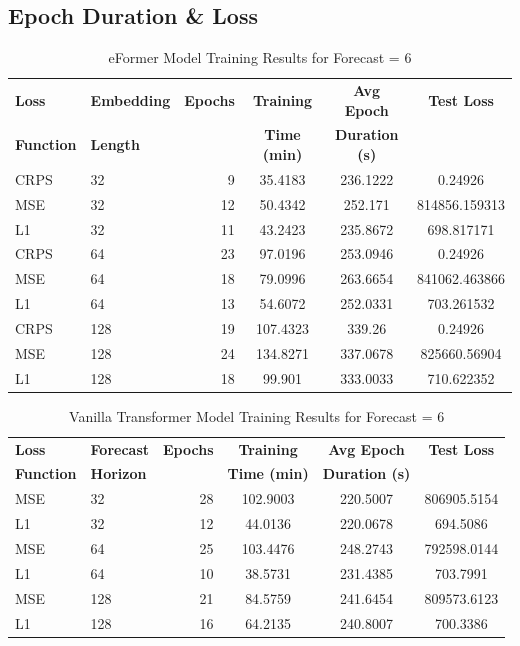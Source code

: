 \documentclass{article}
\begin{document}
\subsection{Epoch Duration \& Loss}

\begin{table}
    \footnotesize
    \centering
    \caption{eFormer Model Training Results for Forecast = 6}
    \begin{tabular}{l|l|r|S|S|S}
        \toprule
        \textbf{Loss} & \textbf{Embedding} & \textbf{Epochs} & \textbf{Training} & \textbf{Avg Epoch} & \textbf{Test Loss} \\
        \textbf{Function} & \textbf{Length} & & \textbf{Time (min)} & \textbf{Duration (s)} & \\
        \midrule
            CRPS & 32 & 9 & 35.4183 & 236.1222 & 0.24926 \\
        MSE & 32 & 12 & 50.4342 & 252.171 & 814856.159313 \\
        L1 & 32 & 11 & 43.2423 & 235.8672 & 698.817171 \\
        \midrule
        CRPS & 64 & 23 & 97.0196 & 253.0946 & 0.24926 \\
        MSE & 64 & 18 & 79.0996 & 263.6654 & 841062.463866 \\
        L1 & 64 & 13 & 54.6072 & 252.0331 & 703.261532 \\
        \midrule
        CRPS & 128 & 19 & 107.4323 & 339.26 & 0.24926 \\
        MSE & 128 & 24 & 134.8271 & 337.0678 & 825660.56904 \\
        L1 & 128 & 18 & 99.901 & 333.0033 & 710.622352 \\
      \bottomrule
    \end{tabular}
    \label{tab:eformer_training_f6}
    \end{table}

\begin{table}
    \centering
    \footnotesize
    \caption{Vanilla Transformer Model Training Results for Forecast = 6}
    \begin{tabular}{l|l|r|S|S|S}
        \toprule
        \textbf{Loss} & \textbf{Forecast} & \textbf{Epochs} & \textbf{Training} & \textbf{Avg Epoch} & \textbf{Test Loss} \\
        \textbf{Function} & \textbf{Horizon} & & \textbf{Time (min)} & \textbf{Duration (s)} & \\
        \midrule
        MSE & 32 & 28 & 102.9003 & 220.5007 & 806905.5154 \\
        L1 & 32 & 12 & 44.0136 & 220.0678 & 694.5086 \\
        \midrule
        MSE & 64 & 25 & 103.4476 & 248.2743 & 792598.0144 \\
        L1 & 64 & 10 & 38.5731 & 231.4385 & 703.7991 \\
        \midrule
        MSE & 128 & 21 & 84.5759 & 241.6454 & 809573.6123 \\
        L1 & 128 & 16 & 64.2135 & 240.8007 & 700.3386 \\
      \bottomrule
    \end{tabular}
    \label{tab:vanillatransformer_training_f6}
    \end{table}
\end{document}
